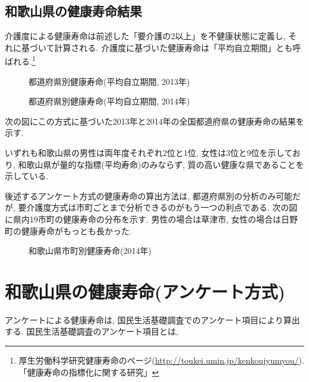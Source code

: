 \subsection{和歌山県の健康寿命結果}
介護度による健康寿命は前述した「要介護の2以上」を不健康状態に定義し, それに基づいて計算される. 介護度に基づいた健康寿命は「平均自立期間」とも呼ばれる.\footnote{厚生労働科学研究健康寿命のページ(\url{http://toukei.umin.jp/kenkoujyumyou/}).
	「健康寿命の指標化に関する研究」
}
\begin{figure}[h!]
	\begin{center}
		\caption{都道府県別健康寿命(平均自立期間, 2013年)}\label{fig1}
	\end{center}
\end{figure}
\begin{figure}[h!]
	\begin{center}
		\caption{都道府県別健康寿命(平均自立期間, 2014年)}\label{fig1}
	\end{center}
\end{figure}
次の図にこの方式に基づいた2013年と2014年の全国都道府県の健康寿命の結果を示す.

いずれも和歌山県の男性は両年度それぞれ2位と1位, 女性は3位と9位を示しており, 和歌山県が量的な指標(平均寿命)のみならず, 質の高い健康な県であることを示している.

後述するアンケート方式の健康寿命の算出方法は,
都道府県別の分析のみ可能だが,
要介護度方式は市町ごとまで分析できるのがもう一つの利点である.
次の図に県内19市町の健康寿命の分布を示す. 男性の場合は草津市, 女性の場合は日野町の健康寿命がもっとも長かった.

\begin{figure}[h!]
	\begin{center}
		\caption{和歌山県市町別健康寿命(2014年)}\label{fig1}
	\end{center}
\end{figure}



\section{和歌山県の健康寿命(アンケート方式)}
アンケートによる健康寿命は,
国民生活基礎調査でのアンケート項目により算出する.
国民生活基礎調査のアンケート項目とは,

